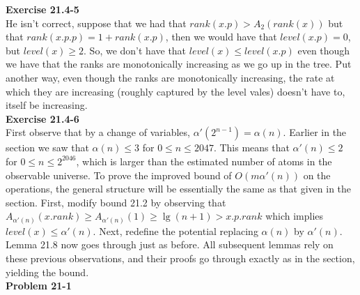 \documentclass{article}
\begin{document}
\noindent\textbf{Exercise 21.4-5}\\

He isn't correct, suppose that we had that $rank(x.p) >A_{2}(rank(x))$ but that $rank(x.p.p) = 1 + rank(x.p)$, then we would have that $level(x.p) =0$, but $level(x) \ge 2$. So, we don't have that $level(x) \le level(x.p)$ even though we have that the ranks are monotonically increasing as we go up in the tree. Put another way, even though the ranks are monotonically increasing, the rate at which they are increasing (roughly captured by the level vales) doesn't have to, itself be increasing.\\ 

\noindent\textbf{Exercise 21.4-6}\\

First observe that by a change of variables, $\alpha'(2^{n-1}) = \alpha(n)$.  Earlier in the section we saw that $\alpha(n) \leq 3$ for $0 \leq n \leq 2047$.  This means that $\alpha'(n) \leq 2$ for $0 \leq n \leq 2^{2046}$, which is larger than the estimated number of atoms in the observable universe.  To prove the improved bound of $O(m\alpha'(n))$ on the operations, the general structure will be essentially the same as that given in the section.  First, modify bound 21.2 by observing that $A_{\alpha'(n)}(x.rank) \geq A_{\alpha'(n)}(1) \geq \lg(n+1) > x.p.rank$ which implies $level(x) \leq \alpha'(n)$.  Next, redefine the potential replacing $\alpha(n)$ by $\alpha'(n)$.  Lemma 21.8 now goes through just as before.  All subsequent lemmas rely on these previous observations, and their proofs go through exactly as in the section, yielding the bound. \\

\noindent\textbf{Problem 21-1}\\
\end{document}
